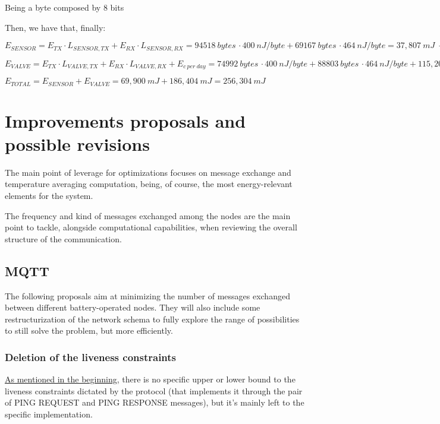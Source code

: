 \documentclass[a4paper,11pt]{article} %
\begin{document}
    Being a byte composed by 8 bits

    \smallskip

    Then, we have that, finally:

    \medskip

    $E_{SENSOR} = E_{TX} \cdot L_{SENSOR, TX} + E_{RX} \cdot L_{SENSOR, RX} = 94518\ bytes \, \cdot 400\ nJ/byte + 69167\ bytes \, \cdot 464\ nJ/byte = 37,807\ mJ\ + 32,093\ mJ = 69,900\ mJ$

    \medskip

    $E_{VALVE} = E_{TX} \cdot L_{VALVE, TX} + E_{RX} \cdot L_{VALVE, RX} + E_{c \ per \ day} = 74992\ bytes \, \cdot 400\ nJ/byte + 88803\ bytes \, \cdot 464\ nJ/byte + 115,200\ mJ = 30,000\ mJ + 41,205\ mJ + 115,200\ mJ = 186,404\ mJ$

    \medskip

    $E_{TOTAL} = E_{SENSOR} + E_{VALVE} = 69,900\ mJ + 186,404\ mJ = 256,304\ mJ$


    \section{Improvements proposals and possible revisions}\label{sec:improvements-proposals-and-possible-revisions}
    The main point of leverage for optimizations focuses on message exchange and temperature averaging computation, being, of course, the most energy-relevant elements for the system.

    The frequency and kind of messages exchanged among the nodes are the main point to tackle, alongside computational capabilities, when reviewing the overall structure of the communication.

    \subsection{MQTT}
    The following proposals aim at minimizing the number of messages exchanged between different battery-operated nodes.
    They will also include some restructurization of the network schema to fully explore the range of possibilities to still solve the problem, but more efficiently.

    \subsubsection{Deletion of the liveness constraints}
    \label{subsubsec:deletion-liveness}

    \hyperref[liveness-mqtt]{As mentioned in the beginning}, there is no specific upper or lower bound to the liveness constraints dictated by the protocol (that implements it through the pair of \textsc{PING REQUEST} and \textsc{PING RESPONSE} messages), but it's mainly left to the specific implementation.
\end{document}
